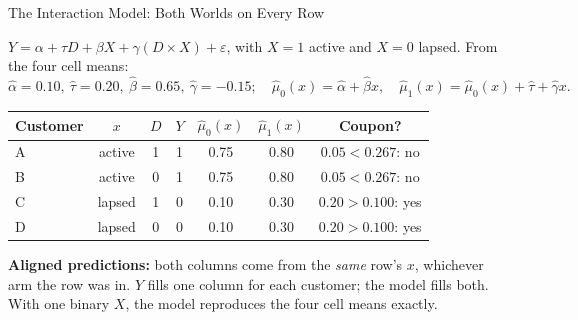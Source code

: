\documentclass[aspectratio=169, 11pt, handout]{beamer}
\begin{document}
\begin{frame}{The Interaction Model: Both Worlds on Every Row}

$Y = \alpha + \tau D + \beta X + \gamma (D \times X) + \varepsilon$, with $X = 1$ active and $X = 0$ lapsed. From the four cell means:
\[
\widehat\alpha = 0.10, \ \widehat\tau = 0.20, \ \widehat\beta = 0.65, \ \widehat\gamma = -0.15;
\quad
\widehat\mu_0(x) = \widehat\alpha + \widehat\beta x, \quad \widehat\mu_1(x) = \widehat\mu_0(x) + \widehat\tau + \widehat\gamma x .
\]

\begin{center}
\small
\begin{tabular}{lcccccc}
\toprule
\textbf{Customer} & $x$ & $D$ & $Y$ & $\widehat\mu_0(x)$ & $\widehat\mu_1(x)$ & \textbf{Coupon?} \\
\midrule
A & active & 1 & 1 & 0.75 & 0.80 & $0.05 < 0.267$: \textcolor{warnred}{no} \\
B & active & 0 & 1 & 0.75 & 0.80 & $0.05 < 0.267$: \textcolor{warnred}{no} \\
C & lapsed & 1 & 0 & 0.10 & 0.30 & $0.20 > 0.100$: \textcolor{sbgreen}{yes} \\
D & lapsed & 0 & 0 & 0.10 & 0.30 & $0.20 > 0.100$: \textcolor{sbgreen}{yes} \\
\bottomrule
\end{tabular}
\end{center}

\textbf{Aligned predictions:} both columns come from the \emph{same} row's $x$, whichever arm the row was in. $Y$ fills one column for each customer; the model fills both. With one binary $X$, the model reproduces the four cell means exactly.
\end{frame}
\end{document}

